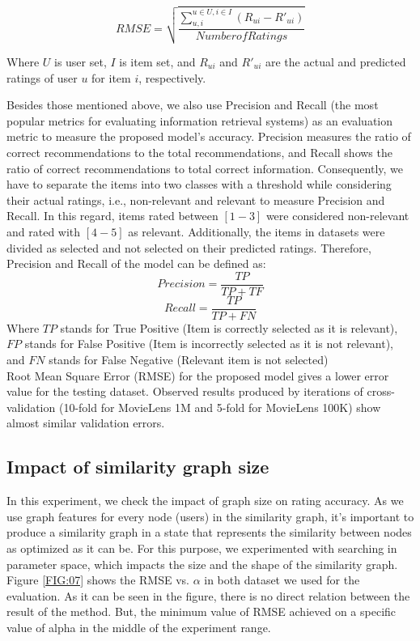 \documentclass[a4paper,fleqn]{cas-dc}
\begin{document}
\begin{equation}
	RMSE = \sqrt{\frac{\sum_{u,i}^{u \in U, i \in I} (R_{ui} - R'_{ui})}{Number of Ratings}}
	\label{eq_RMSE}
\end{equation}

Where $U$ is user set, $I$ is item set, and $R_{ui}$ and $R'_{ui}$ are the actual and predicted ratings of user $u$ for item $i$, respectively.

Besides those mentioned above, we also use Precision and Recall (the most popular metrics for evaluating information retrieval systems) as an evaluation metric to measure the proposed model's accuracy. Precision measures the ratio of correct recommendations to the total recommendations, and Recall shows the ratio of correct recommendations to total correct information. Consequently, we have to separate the items into two classes with a threshold while considering their actual ratings, i.e., non-relevant and relevant to measure Precision and Recall. In this regard, items rated between $[1-3]$ were considered non-relevant and rated with $[4-5]$ as relevant. Additionally, the items in datasets were divided as selected and not selected on their predicted ratings. Therefore, Precision and Recall of the model can be defined as:
\begin{equation}
	Precision = \frac{TP}{TP+TF}
\end{equation}
\begin{equation}
	Recall = \frac{TP}{TP+FN}
\end{equation}
Where $TP$ stands for True Positive (Item is correctly selected as it is relevant), $FP$ stands for False Positive (Item is incorrectly selected as it is not relevant), and $FN$ stands for False Negative (Relevant item is not selected)\\

Root Mean Square Error (RMSE) for the proposed model gives a lower error value for the testing dataset. Observed results produced by iterations of cross-validation (10-fold for MovieLens 1M and 5-fold for MovieLens 100K) show almost similar validation errors.

\subsection{Impact of similarity graph size}
\label{test:simgraph}
In this experiment, we check the impact of graph size on rating accuracy. As we use graph features for every node (users) in the similarity graph, it's important to produce a similarity graph in a state that represents the similarity between nodes as optimized as it can be. For this purpose, we experimented with searching in parameter space, which impacts the size and the shape of the similarity graph. Figure \ref{FIG:07} shows the RMSE vs. $\alpha$ in both dataset we used for the evaluation. As it can be seen in the figure, there is no direct relation between the result of the method. But, the minimum value of RMSE achieved on a specific value of alpha in the middle of the experiment range.
\end{document}
